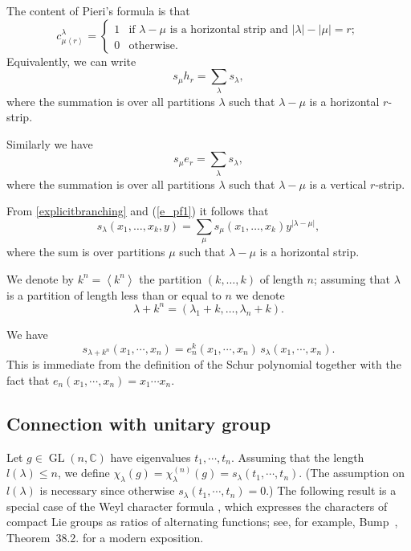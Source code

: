 \documentclass[11pt]{amsart}
\newcommand{\tmop}[1]{\ensuremath{\operatorname{#1}}}
\begin{document}
The content of Pieri's formula is that
\begin{equation} \label{e:pieri}
  c^{\lambda}_{\mu \left\langle r \right\rangle} = \begin{cases}
      1 & \text{if $\lambda - \mu$ is a horizontal strip and $| \lambda | - |
      \mu | = r ;$}\\
      0 & \text{otherwise.}
    \end{cases}
\end{equation}
Equivalently, we can write
\begin{equation}
\label{e_pf1} s_{\mu} h_r = \sum_{\lambda} s_{\lambda},
\end{equation}
where the summation is over all partitions $\lambda$ such that
$\lambda - \mu$ is a horizontal $r$-strip.

Similarly we have
\begin{equation} \label{e_pf2}
s_{\mu} e_r = \sum_{\lambda} s_{\lambda},
\end{equation}
where the summation is over all partitions $\lambda$ such that
$\lambda - \mu$ is a vertical $r$-strip.

From \eqref{explicitbranching} and (\ref{e_pf1}) it follows that
\begin{equation}
\label{extvar} s_{\lambda}(x_1, \ldots, x_k, y)=
\sum_{\mu}s_{\mu}(x_1, \ldots, x_k)y^{|\lambda- \mu|},
\end{equation}
where the sum is over partitions $\mu$ such that $\lambda - \mu$
is a horizontal strip.

We denote by $k^n=\left<k^n\right>$ the partition $(k, \ldots, k)$
of length $n$; assuming that $\lambda$ is a partition of length
less than or equal to $n$ we denote
\[\lambda + k^n =(\lambda_1 +k, \ldots, \lambda_n +k).\]

We have
\begin{equation}
\label{e_pf3} s_{\lambda + k^n}(x_1,\cdots,x_n)
=e_{n}^k(x_1,\cdots,x_n)\,s_{\lambda}(x_1,\cdots,x_n).
\end{equation}
This is immediate from the definition of the Schur polynomial
together with the fact that $e_n(x_1,\cdots,x_n)=x_1\cdots x_n$.

\subsection{Connection with unitary group}
Let $g \in \tmop{GL} ( n,\mathbb{C})$ have eigenvalues $t_1,
\cdots, t_n$. Assuming that the length $l ( \lambda ) \leqslant
n$, we define $\chi_{\lambda} ( g ) = \chi_{\lambda}^{( n )} ( g )
= s_{\lambda} ( t_1, \cdots, t_n )$. (The assumption on $l (
\lambda )$ is necessary since otherwise $s_{\lambda} ( t_1,
\cdots, t_n ) = 0$.) The following result  is a special case of
the Weyl character formula \cite{weyl}, which expresses the
characters of compact Lie groups as ratios of alternating
functions; see, for example, Bump~{\cite{DB}}, Theorem~38.2. for a
modern exposition.
\end{document}

